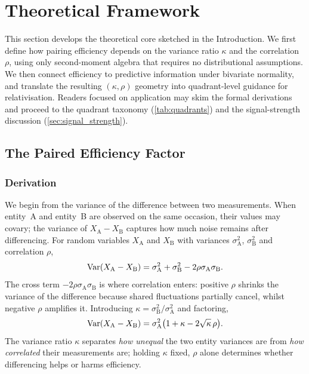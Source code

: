 \section{Theoretical Framework}
\label{sec:theory}

This section develops the theoretical core sketched in the Introduction. We first define how pairing efficiency depends on the variance ratio $\kappa$ and the correlation $\rho$, using only second-moment algebra that requires no distributional assumptions. We then connect efficiency to predictive information under bivariate normality, and translate the resulting $(\kappa,\rho)$ geometry into quadrant-level guidance for relativisation. Readers focused on application may skim the formal derivations and proceed to the quadrant taxonomy (\cref{tab:quadrants}) and the signal-strength discussion (\cref{sec:signal_strength}).

\subsection{The Paired Efficiency Factor}

\subsubsection{Derivation}

We begin from the variance of the difference between two measurements. When entity~A and entity~B are observed on the same occasion, their values may covary; the variance of $X_{\mathrm{A}}-X_{\mathrm{B}}$ captures how much noise remains after differencing. For random variables $X_{\mathrm{A}}$ and $X_{\mathrm{B}}$ with variances $\sigma^{2}_{\mathrm{A}}$, $\sigma^{2}_{\mathrm{B}}$ and correlation $\rho$,
\begin{equation}
  \operatorname{Var}(X_{\mathrm{A}} - X_{\mathrm{B}}) = \sigma^{2}_{\mathrm{A}} + \sigma^{2}_{\mathrm{B}} - 2\rho\sigma_{\mathrm{A}}\sigma_{\mathrm{B}}.
  \label{eq:var_sum}
\end{equation}
The cross term $-2\rho\sigma_{\mathrm{A}}\sigma_{\mathrm{B}}$ is where correlation enters: positive $\rho$ shrinks the variance of the difference because shared fluctuations partially cancel, whilst negative $\rho$ amplifies it. Introducing $\kappa=\sigma^{2}_{\mathrm{B}}/\sigma^{2}_{\mathrm{A}}$ and factoring,
\begin{equation}
  \operatorname{Var}(X_{\mathrm{A}} - X_{\mathrm{B}}) = \sigma^{2}_{\mathrm{A}}\bigl(1 + \kappa - 2\sqrt{\kappa}\,\rho\bigr).
  \label{eq:var_factored}
\end{equation}
The variance ratio $\kappa$ separates \emph{how unequal} the two entity variances are from \emph{how correlated} their measurements are; holding $\kappa$ fixed, $\rho$ alone determines whether differencing helps or harms efficiency.

